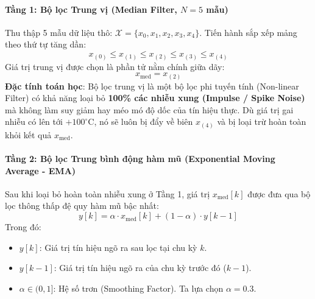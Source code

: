 \paragraph{Tầng 1: Bộ lọc Trung vị (Median Filter, $N = 5$ mẫu)}
Thu thập 5 mẫu dữ liệu thô: $\mathcal{X} = \{x_0, x_1, x_2, x_3, x_4\}$. Tiến hành sắp xếp mảng theo thứ tự tăng dần:
\begin{equation}
x_{(0)} \le x_{(1)} \le x_{(2)} \le x_{(3)} \le x_{(4)}
\end{equation}
Giá trị trung vị được chọn là phần tử nằm chính giữa dãy:
\begin{equation}
x_{\text{med}} = x_{(2)}
\end{equation}
\textbf{Đặc tính toán học}: Bộ lọc trung vị là một bộ lọc phi tuyến tính (Non-linear Filter) có khả năng loại bỏ \textbf{100\% các nhiễu xung (Impulse / Spike Noise)} mà không làm suy giảm hay méo mó độ dốc của tín hiệu thực. Dù giá trị gai nhiễu có lên tới $+100^\circ\text{C}$, nó sẽ luôn bị đẩy về biên $x_{(4)}$ và bị loại trừ hoàn toàn khỏi kết quả $x_{\text{med}}$.

\paragraph{Tầng 2: Bộ lọc Trung bình động hàm mũ (Exponential Moving Average - EMA)}
Sau khi loại bỏ hoàn toàn nhiễu xung ở Tầng 1, giá trị $x_{\text{med}}[k]$ được đưa qua bộ lọc thông thấp đệ quy hàm mũ bậc nhất:
\begin{equation}
y[k] = \alpha \cdot x_{\text{med}}[k] + (1 - \alpha) \cdot y[k-1]
\end{equation}
Trong đó:
\begin{itemize}[leftmargin=*]
    \item $y[k]$: Giá trị tín hiệu ngõ ra sau lọc tại chu kỳ $k$.
    \item $y[k-1]$: Giá trị tín hiệu ngõ ra của chu kỳ trước đó ($k-1$).
    \item $\alpha \in (0, 1]$: Hệ số trơn (Smoothing Factor). Ta lựa chọn $\alpha = 0.3$.
\end{itemize}

